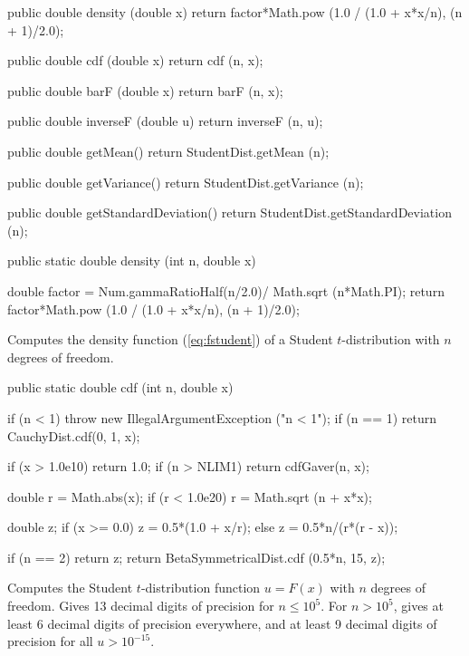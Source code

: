 \begin{code}\begin{hide}

   public double density (double x) {
      return factor*Math.pow (1.0 / (1.0 + x*x/n), (n + 1)/2.0);
   }

   public double cdf (double x) {
      return cdf (n, x);
   }

   public double barF (double x) {
      return barF (n, x);
   }

   public double inverseF (double u) {
      return inverseF (n, u);
   }

   public double getMean() {
      return StudentDist.getMean (n);
   }

   public double getVariance() {
      return StudentDist.getVariance (n);
   }

   public double getStandardDeviation() {
      return StudentDist.getStandardDeviation (n);
   }\end{hide}

   public static double density (int n, double x)\begin{hide} {
      double factor = Num.gammaRatioHalf(n/2.0)/ Math.sqrt (n*Math.PI);
      return factor*Math.pow (1.0 / (1.0 + x*x/n), (n + 1)/2.0);
   }\end{hide}
\end{code}
\begin{tabb} Computes the density function (\ref{eq:fstudent}) of a
   Student $t$-distribution with $n$ degrees of freedom.
\end{tabb}
\begin{code}

   public static double cdf (int n, double x)\begin{hide} {
      if (n < 1)
        throw new IllegalArgumentException ("n < 1");
      if (n == 1)
         return CauchyDist.cdf(0, 1, x);

      if (x > 1.0e10)
         return 1.0;
      if (n > NLIM1)
         return cdfGaver(n, x);

      double r = Math.abs(x);
      if (r < 1.0e20)
         r = Math.sqrt (n + x*x);

      double z;
      if (x >= 0.0)
         z = 0.5*(1.0 + x/r);
      else
         z = 0.5*n/(r*(r - x));

      if (n == 2)
         return z;
      return BetaSymmetricalDist.cdf (0.5*n, 15, z);
   }\end{hide}
\end{code}
  \begin{tabb}
  Computes the Student $t$-distribution function $u=F(x)$ with $n$ degrees of freedom.
  Gives 13 decimal digits of precision for $n \le 10^5$.
 For $n >  10^5$, gives  at least 6 decimal digits of precision everywhere, and
 at least 9 decimal digits of precision for all $u >  10^{-15}$.
  \end{tabb}
